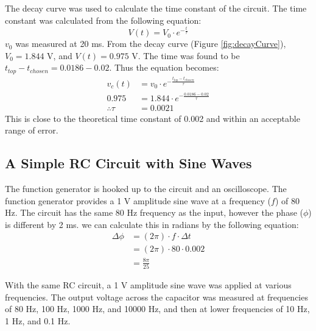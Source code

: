 \documentclass[12pt]{article}
\begin{document}
The decay curve was used to calculate the time constant of 
the circuit. The time constant was calculated from the following
equation:
\[
V(t) = V_0 \cdot e^{-\frac{t}{\tau}}
\]
$v_0$ was measured at 20 ms. From the decay curve (Figure \ref{fig:decayCurve}), 
$V_0 = 1.844$ V, and $V(t) = 0.975$ V. The time was found to be
$t_{top} - t_{chosen} = 0.0186 - 0.02$.
Thus the equation becomes:
\begin{align*}
	v_c (t) &= v_0 \cdot e^{-\frac{t_{top} - t_{chosen}}{\tau}} \\
	0.975 &= 1.844 \cdot e^{-\frac{0.0186 - 0.02}{\tau}} \\
	\therefore \tau &= 0.0021
\end{align*}
This is close to the theoretical time constant of 0.002 and within an acceptable 
range of error.

\subsection{A Simple RC Circuit with Sine Waves} \label{subsec:part 2}
The function generator is hooked up to the circuit and an 
oscilloscope. The function generator provides a 1 V amplitude
sine wave at a frequency ($f$) of 80 Hz. The circuit has the 
same 80 Hz frequency as the input, however the phase ($\phi$)
is different by 2 ms. we can calculate this in radians by the 
following equation:
\begin{align*}
	\Delta \phi &= (2 \pi)\cdot f \cdot \Delta t \\
				&= (2 \pi) \cdot 80 \cdot 0.002 \\
				&= \frac{8 \pi}{25}
\end{align*}
	
With the same RC circuit, a 1 V amplitude sine wave was applied at various
frequencies. The output voltage across the capacitor was measured at frequencies
of 80 Hz, 100 Hz, 1000 Hz, and 10000 Hz, and then at lower frequencies of 10 Hz,
1 Hz, and 0.1 Hz.
\newline
\end{document}
